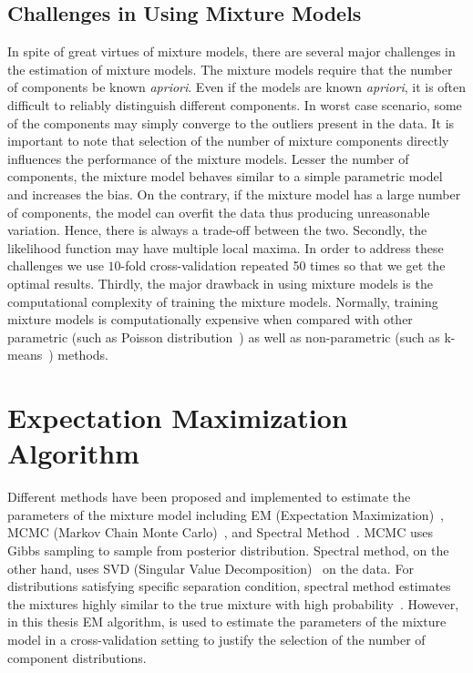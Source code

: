 \subsection*{Challenges in Using Mixture Models}
\label{ss:challanges}
In spite of great virtues of mixture models, there are several major challenges in the estimation of mixture models. The mixture models require that the number of components be known \textit{apriori}. Even if the models are known \textit{apriori}, it is often difficult to reliably distinguish different components. In worst case scenario, some of the components may simply converge to the outliers present in the data. It is important to note that selection of the number of mixture components directly influences the performance of the mixture models. Lesser the number of components, the mixture model behaves similar to a simple parametric model and increases the bias. On the contrary, if the mixture model has a large number of components, the model can overfit the data thus producing unreasonable variation. Hence, there is always a trade-off between the two. Secondly, the likelihood function may have multiple local maxima. In order to address these challenges we use $10$-fold cross-validation repeated 50 times so that we get the optimal results. Thirdly, the major drawback in using mixture models is the computational complexity of training the mixture models. Normally, training mixture models is computationally expensive when compared with other parametric (such as Poisson distribution~\cite{poission}) as well as non-parametric (such as k-means~\cite{kmeans, kmeans2}) methods. 


\section{Expectation Maximization Algorithm}
\label{s:em}
Different methods have been proposed and implemented to estimate the parameters of the mixture model including EM (Expectation Maximization)~\cite{wolfe, expectmax}, MCMC (Markov Chain Monte Carlo)~\cite{mcmcintro}, and Spectral Method~\cite{spectralmethod1, spectralmethod}. MCMC uses Gibbs sampling to sample from posterior distribution. Spectral method, on the other hand, uses SVD (Singular Value Decomposition)~\cite{matrixcomputation, svdgolub} on the data. For distributions satisfying specific separation condition, spectral method estimates the mixtures highly similar to the true mixture with high probability~\cite{spectralmethod}. However, in this thesis EM algorithm, is used to estimate the parameters of the mixture model in a cross-validation setting to justify the selection of the number of component distributions.

